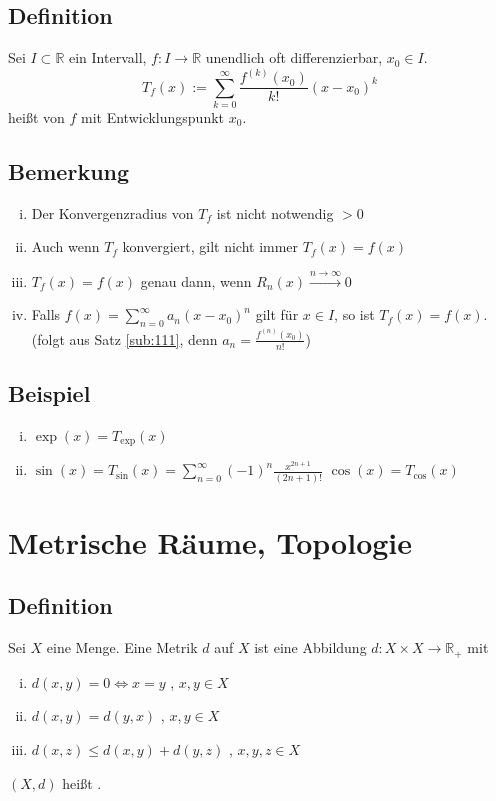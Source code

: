 
\subsection[Defintion Taylorreihe]{Definition} %
\label{sub:115}
Sei $I \subset \mathds{R}$ ein Intervall, $f : I \to \mathds{R}$ unendlich oft differenzierbar, $x_0 \in I$. 
\[
	T_f (x) := \sum_{k=0}^{\infty} \frac{f^{(k)} (x_0)}{k!} (x-x_0)^k 
\]
heißt  von $f$ mit Entwicklungspunkt $x_0$.

\subsection[Bemerkung über Eigenschaften von Tayloreihen]{Bemerkung} %
\label{sub:116}
\begin{enumerate}[(i)]
	\item Der Konvergenzradius von $T_f$ ist nicht notwendig $>0$
	\item Auch wenn $T_f$ konvergiert, gilt nicht immer $T_f(x)=f(x)$
	\item $T_f(x)= f(x)$ genau dann, wenn $R_n(x) \xrightarrow{n \to \infty} 0$
	\item Falls $f(x)= \sum_{n=0}^{\infty} a_n (x-x_0)^n$ gilt für $x \in I$, so ist $T_f(x)= f(x)$. \\
	{\footnotesize (folgt aus Satz \ref{sub:111}, denn $a_n = \frac{f^{(n)}(x_0)}{n!}$)}
\end{enumerate}

\subsection[Beispiele für Taylorreihen]{Beispiel} %
\label{sub:117}
\begin{enumerate}[(i)]
	\item $\exp (x) = T_{\exp}(x) $
	\item $\sin (x) = T_{\sin}(x) = \sum_{n=0}^{\infty}(-1)^n \frac{x^{2n+1}}{(2n+1)!} $ \qquad $\cos (x) = T_{\cos}(x) $
\end{enumerate}
\newpage
\section{Metrische Räume, Topologie} %
\label{sec:2}

\subsection[Definition metrischer Raum]{Definition} %
\label{sub:21}
Sei $X$ eine Menge. Eine Metrik $d$ auf $X$ ist eine Abbildung $d : X \times X \to \mathds{R}_+$ mit 
\begin{enumerate}[(i)]
	\item $d(x,y) = 0 \iff x=y$ , $x,y \in X$
	\item $d(x,y)= d(y,x)$ , $x,y \in X$
	\item $d(x,z)\le d(x,y)+ d(y,z)$ , $x,y,z \in X$
\end{enumerate}
$(X,d)$ heißt . 

